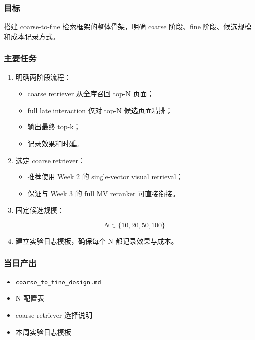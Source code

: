 \documentclass[UTF8,a4paper,12pt]{ctexart}
\begin{document}
	\subsubsection*{目标}
	
	搭建 coarse-to-fine 检索框架的整体骨架，明确 coarse 阶段、fine 阶段、候选规模和成本记录方式。
	
	\subsubsection*{主要任务}
	
	\begin{enumerate}[leftmargin=2em]
		\item 明确两阶段流程：
		\begin{itemize}
			\item coarse retriever 从全库召回 top-N 页面；
			\item full late interaction 仅对 top-N 候选页面精排；
			\item 输出最终 top-k；
			\item 记录效果和时延。
		\end{itemize}
		
		\item 选定 coarse retriever：
		\begin{itemize}
			\item 推荐使用 Week 2 的 single-vector visual retrieval；
			\item 保证与 Week 3 的 full MV reranker 可直接衔接。
		\end{itemize}
		
		\item 固定候选规模：
		
		$$
		N \in \{10, 20, 50, 100\}
		$$
		
		\item 建立实验日志模板，确保每个 N 都记录效果与成本。
	\end{enumerate}
	
	\subsubsection*{当日产出}
	
	\begin{itemize}[leftmargin=2em]
		\item \texttt{coarse\_to\_fine\_design.md}
		\item N 配置表
		\item coarse retriever 选择说明
		\item 本周实验日志模板
	\end{itemize}
	
\end{document}
